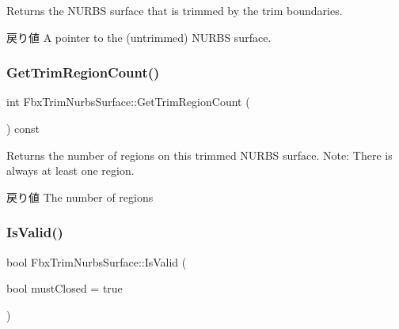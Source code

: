 Returns the N\+U\+R\+BS surface that is trimmed by the trim boundaries. \begin{DoxyReturn}{戻り値}
A pointer to the (untrimmed) N\+U\+R\+BS surface. 
\end{DoxyReturn}
\mbox{\label{class_fbx_trim_nurbs_surface_af9deaac6001549449325ca4112e3a58a}} 
\subsubsection{\texorpdfstring{Get\+Trim\+Region\+Count()}{GetTrimRegionCount()}}
{\footnotesize\ttfamily int Fbx\+Trim\+Nurbs\+Surface\+::\+Get\+Trim\+Region\+Count (\begin{DoxyParamCaption}{ }\end{DoxyParamCaption}) const}

Returns the number of regions on this trimmed N\+U\+R\+BS surface. Note\+: There is always at least one region. \begin{DoxyReturn}{戻り値}
The number of regions 
\end{DoxyReturn}
\mbox{\label{class_fbx_trim_nurbs_surface_abf1cabd0b59cd6eefb780b1ae29635b4}} 
\subsubsection{\texorpdfstring{Is\+Valid()}{IsValid()}\hspace{0.1cm}{\footnotesize\ttfamily [1/2]}}
{\footnotesize\ttfamily bool Fbx\+Trim\+Nurbs\+Surface\+::\+Is\+Valid (\begin{DoxyParamCaption}\item[{bool}]{must\+Closed = {\ttfamily true} }\end{DoxyParamCaption})}

\mbox{\label{class_fbx_trim_nurbs_surface_aef8d884e0cf1369ea7dc01e2782f7571}} 
